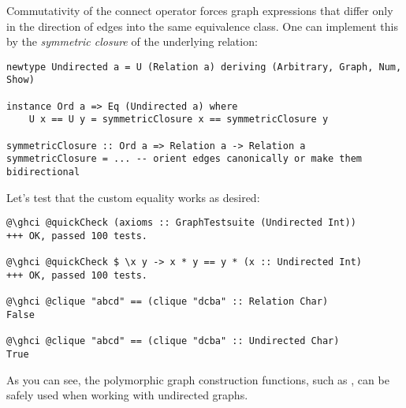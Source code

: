 Commutativity of the connect operator forces graph expressions that differ only
in the direction of edges into the same equivalence class. One can implement
this by the \emph{symmetric closure} of the underlying relation:

\begin{verbatim}
newtype Undirected a = U (Relation a) deriving (Arbitrary, Graph, Num, Show)

instance Ord a => Eq (Undirected a) where
    U x == U y = symmetricClosure x == symmetricClosure y

symmetricClosure :: Ord a => Relation a -> Relation a
symmetricClosure = ... -- orient edges canonically or make them bidirectional
\end{verbatim}

Let's test that the custom equality works as desired:
\begin{verbatim}
@\ghci @quickCheck (axioms :: GraphTestsuite (Undirected Int))
+++ OK, passed 100 tests.

@\ghci @quickCheck $ \x y -> x * y == y * (x :: Undirected Int)
+++ OK, passed 100 tests.

@\ghci @clique "abcd" == (clique "dcba" :: Relation Char)
False

@\ghci @clique "abcd" == (clique "dcba" :: Undirected Char)
True
\end{verbatim}

As you can see, the polymorphic graph construction functions, such as ,
can be safely used when working with undirected graphs.
